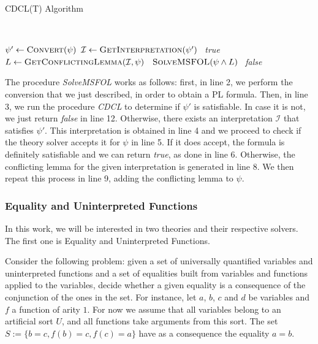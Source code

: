 \begin{algorithm}[H]
\caption{CDCL(T) Algorithm}~\label{cdclTAlgo}
\begin{algorithmic}[1]
\State $\psi' \gets \Call{Convert}{\psi}$ 
  \State $\mathcal{I} \gets \Call{GetInterpretation}{\psi'}$
   
    \State~\Return \textit{true}
  \Else
    \State $L \gets \Call{GetConflictingLemma}{\mathcal{I}, \psi}$
    \State~\Return $\Call{SolveMSFOL}{\psi \wedge L}$
  \EndIf
\Else
  \State~\Return \textit{false}
\EndIf
\EndFunction
\end{algorithmic}
\end{algorithm}

The procedure \textit{SolveMSFOL} works as follows: first, in line 2, we perform the conversion that we just described, in order to obtain a PL formula. Then, in line 3, we run the procedure \textit{CDCL} to determine if $\psi'$ is satisfiable. In case it is not, we just return \textit{false} in line 12. Otherwise, there exists an interpretation $\mathcal{I}$ that satisfies $\psi'$. This interpretation is obtained in line 4 and we proceed to check if the theory solver accepts it for $\psi$ in line 5. If it does accept, the formula is definitely satisfiable and we can return \textit{true}, as done in line 6. Otherwise, the conflicting lemma for the given interpretation is generated in line 8. We then repeat this process in line 9, adding the conflicting lemma to $\psi$.

\subsubsection{Equality and Uninterpreted Functions}

In this work, we will be interested in two theories and their respective solvers. The first one is Equality and Uninterpreted Functions.

Consider the following problem: given a set of universally quantified variables and uninterpreted functions and a set of equalities built from variables and functions applied to the variables, decide whether a given equality is a consequence of the conjunction of the ones in the set. For instance, let $a$, $b$, $c$ and $d$ be variables and $f$ a function of arity $1$. For now we assume that all variables belong to an artificial sort $U$, and all functions take arguments from this sort. The set $S := \{b = c, f(b) = c, f(c) = a\}$ have as a consequence the equality $a = b$.


